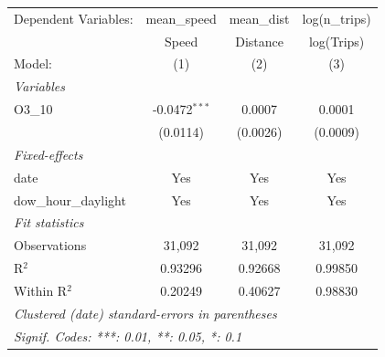 \begingroup
\centering
\begin{tabular}{lccc}
   \tabularnewline \midrule \midrule
   Dependent Variables:  & mean\_speed     & mean\_dist  & log(n\_trips)\\   
                         & Speed           & Distance    & log(Trips) \\   
   Model:                & (1)             & (2)         & (3)\\  
   \midrule
   \emph{Variables}\\
   O3\_10                & -0.0472$^{***}$ & 0.0007      & 0.0001\\   
                         & (0.0114)        & (0.0026)    & (0.0009)\\   
   \midrule
   \emph{Fixed-effects}\\
   date                  & Yes             & Yes         & Yes\\  
   dow\_hour\_daylight   & Yes             & Yes         & Yes\\  
   \midrule
   \emph{Fit statistics}\\
   Observations          & 31,092          & 31,092      & 31,092\\  
   R$^2$                 & 0.93296         & 0.92668     & 0.99850\\  
   Within R$^2$          & 0.20249         & 0.40627     & 0.98830\\  
   \midrule \midrule
   \multicolumn{4}{l}{\emph{Clustered (date) standard-errors in parentheses}}\\
   \multicolumn{4}{l}{\emph{Signif. Codes: ***: 0.01, **: 0.05, *: 0.1}}\\
\end{tabular}
\par\endgroup
